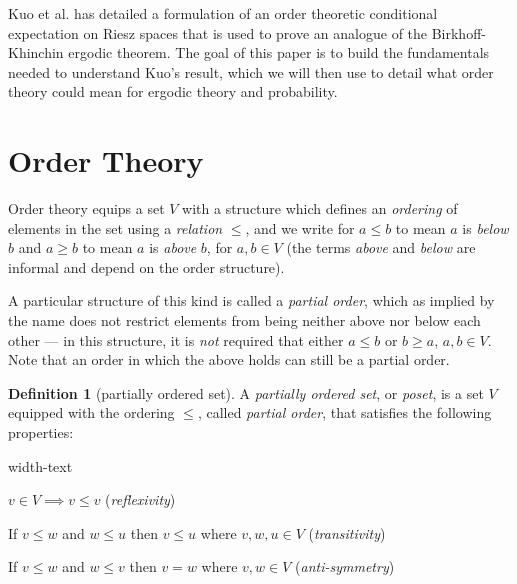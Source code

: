 \documentclass[letterpaper,10pt,oneside,onecolumn,reqno]{amsart}
\theoremstyle{definition}
\newtheorem{defn}{Definition}
\begin{document}
Kuo et al.\cite{Kuo2007422} has detailed a formulation of an order
theoretic conditional expectation on Riesz spaces that is used to
prove an analogue of the Birkhoff-Khinchin ergodic theorem. The goal
of this paper is to build the fundamentals needed to understand Kuo's
result, which we will then use to detail what order theory could mean
for ergodic theory and probability.


\part{Order Theory}

Order theory equips a set $V$ with a structure which defines an
\emph{ordering} of elements in the set using a \emph{relation} $\leq$,
and we write for $a \leq b$ to mean $a$ is \emph{below} $b$ and $a
\geq b$ to mean $a$ is \emph{above} $b$, for $a,b \in V$ (the terms
\emph{above} and \emph{below} are informal and depend on the order
structure).

A particular structure of this kind is called a \emph{partial order},
which as implied by the name does not restrict elements from being
neither above nor below each other --- in this structure, it is
\emph{not} required that either $a \leq b$ or $b \geq a$, $a,b \in
V$. Note that an order in which the above holds can still be a partial
order.

  \begin{defn}[partially ordered set]\label{def:1}
    A \emph{partially ordered set}, or
    \emph{poset}, is a set $V$ equipped with the ordering
    $\leq$, called \emph{partial order}, that satisfies the following
    properties:

    \begin{deflist}{width-text}
    \item $v \in V \implies v \leq v$ (\emph{reflexivity})
    \item If $v \leq w$ and $w \leq u$ then $v \leq u$ where $v,w,u
      \in V$ (\emph{transitivity})
    \item If $v \leq w$ and $w \leq v$ then $v = w$ where $v,w \in V$
      (\emph{anti-symmetry})
    \end{deflist}
  \end{defn}
\end{document}

